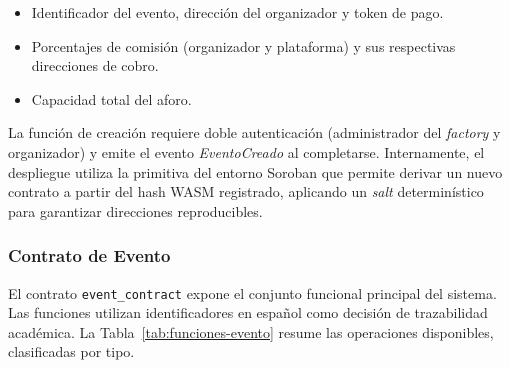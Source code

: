 \begin{itemize}\setlength{\itemsep}{2pt}
    \item Identificador del evento, dirección del organizador y token de pago.
    \item Porcentajes de comisión (organizador y plataforma) y sus respectivas direcciones de cobro.
    \item Capacidad total del aforo.
\end{itemize}

La función de creación requiere doble autenticación (administrador del \textit{factory} y organizador) y
emite el evento \textit{EventoCreado} al completarse. Internamente, el despliegue utiliza la primitiva del
entorno Soroban que permite derivar un nuevo contrato a partir del hash WASM registrado, aplicando un
\textit{salt} determinístico para garantizar direcciones reproducibles.

\subsubsection{Contrato de Evento}

El contrato \texttt{event\_contract} expone el conjunto funcional principal del sistema. Las funciones
utilizan identificadores en español como decisión de trazabilidad académica. La
Tabla~\ref{tab:funciones-evento} resume las operaciones disponibles, clasificadas por tipo.

